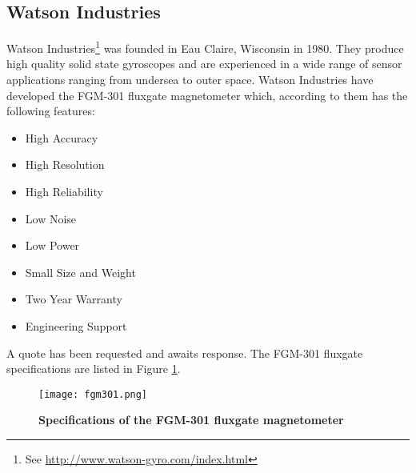 \documentclass[a4paper,10pt]{report}
\begin{document}
\subsection*{Watson Industries}
Watson Industries\footnote{See \url{http://www.watson-gyro.com/index.html}} was founded
in Eau Claire, Wisconsin in 1980. They produce high quality solid state gyroscopes and
are experienced in a wide range of sensor applications ranging from undersea to outer
space. Watson Industries have developed the FGM-301 fluxgate magnetometer which,
according to them has the following features:
\begin{itemize}
 \item High Accuracy
 \item High Resolution
 \item High Reliability
 \item Low Noise
 \item Low Power
 \item Small Size and Weight
 \item Two Year Warranty
 \item Engineering Support
\end{itemize}
A quote has been requested and awaits response. The FGM-301 fluxgate specifications are
listed in Figure
\ref{FGM}.
\begin{figure}[!h]
\centering
\texttt{[image: fgm301.png]}
\caption{\textbf{Specifications of the FGM-301 fluxgate magnetometer}}
\label{FGM}
\end{figure}
\end{document}
